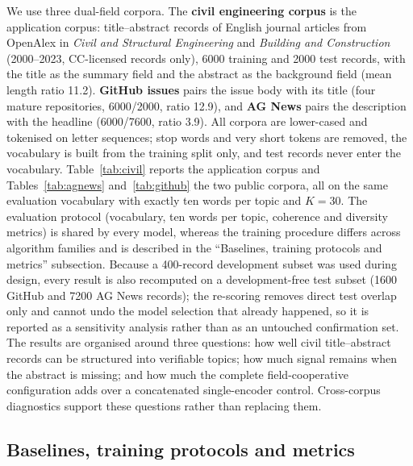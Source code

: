 \documentclass[Journal,letterpaper]{ascelike-new}
\begin{document}
We use three dual-field corpora. The \textbf{civil engineering corpus} is the application corpus:
title--abstract records of English journal articles from OpenAlex \cite{openalex2022} in \emph{Civil and Structural
Engineering} and \emph{Building and Construction} (2000--2023, CC-licensed records only), 6000
training and 2000 test records, with the title as the summary field and the abstract as the
background field (mean length ratio 11.2). \textbf{GitHub issues} \cite{openindex2026} pairs the
issue body with its title (four mature repositories, 6000/2000, ratio 12.9), and \textbf{AG News}
\cite{zhang2015char} pairs the description
with the headline (6000/7600, ratio 3.9). All corpora are lower-cased and tokenised on letter
sequences; stop words and very short tokens are removed, the vocabulary is built from the training
split only, and test records never enter the vocabulary. Table~\ref{tab:civil} reports the
application corpus and Tables~\ref{tab:agnews} and~\ref{tab:github} the two public corpora, all on
the same evaluation vocabulary with exactly ten words per topic and $K=30$. The evaluation
protocol (vocabulary, ten words per topic, coherence and
diversity metrics) is shared by every model, whereas the training procedure differs across
algorithm families and is described in the ``Baselines, training protocols and metrics'' subsection. Because a 400-record
development subset was used during design, every result is also
recomputed on a development-free test subset (1600 GitHub and 7200 AG News records); the
re-scoring removes direct test overlap only and cannot undo the model selection that already
happened, so it is reported as a sensitivity analysis rather than as an untouched confirmation
set. The results are organised around three questions: how well civil title--abstract records can
be structured into verifiable topics; how much signal remains when the abstract is missing; and
how much the complete field-cooperative configuration adds over a concatenated single-encoder
control. Cross-corpus diagnostics support these questions rather than replacing them.

\subsection{Baselines, training protocols and metrics}
\label{sec:protocol}
\end{document}
